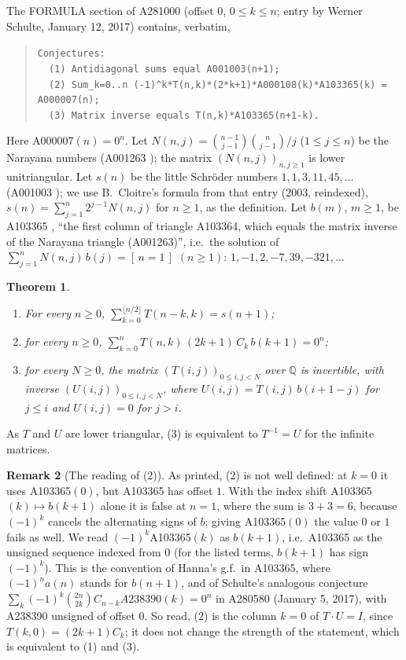 \documentclass[11pt]{amsart}
\theoremstyle{plain}
\newtheorem{theorem}{Theorem}
\theoremstyle{definition}
\newtheorem{remark}[theorem]{Remark}
\newcommand{\Q}{\mathbb{Q}}
\newcommand{\ib}[1]{[\,#1\,]}
\newcommand{\lb}{\char123}
\newcommand{\rb}{\char125}
\begin{document}
The FORMULA section of A281000 \cite{A281000} (offset $0$, $0\le k\le n$; entry by Werner Schulte, January 12, 2017) contains, verbatim,
\begin{quote}\raggedright\footnotesize
\texttt{Conjectures:}\\
\texttt{\ \ (1) Antidiagonal sums equal A001003(n+1);}\\
\texttt{\ \ (2) Sum\_\lb k=0..n\rb\ (-1)\^{}k*T(n,k)*(2*k+1)*A000108(k)*A103365(k) = A000007(n);}\\
\texttt{\ \ (3) Matrix inverse equals T(n,k)*A103365(n+1-k).}
\end{quote}
Here A000007$(n)=0^n$. Let $N(n,j)=\binom{n-1}{j-1}\binom n{j-1}/j$ ($1\le j\le n$) be the Narayana numbers (A001263 \cite{A001263}); the matrix $(N(n,j))_{n,j\ge1}$ is lower unitriangular. Let $s(n)$ be the little Schr\"oder numbers $1,1,3,11,45,\dots$ (A001003 \cite{A001003}); we use B.~Cloitre's formula from that entry (2003, reindexed), $s(n)=\sum_{j=1}^{n}2^{j-1}N(n,j)$ for $n\ge1$, as the definition. Let $b(m)$, $m\ge1$, be A103365 \cite{A103365}, ``the first column of triangle A103364, which equals the matrix inverse of the Narayana triangle (A001263)'', i.e.\ the solution of $\sum_{j=1}^{n}N(n,j)\,b(j)=\ib{n=1}$ $(n\ge1)$: $1,-1,2,-7,39,-321,\dots$

\begin{theorem}\label{thm:main}
\begin{enumerate}
\item[(1)] For every $n\ge0$,  $\displaystyle\sum_{k=0}^{\lfloor n/2\rfloor}T(n-k,k)=s(n+1)$;
\item[(2)] for every $n\ge0$, $\displaystyle\sum_{k=0}^{n}T(n,k)\,(2k+1)\,C_k\,b(k+1)=0^n$;
\item[(3)] for every $N\ge0$, the matrix $(T(i,j))_{0\le i,j<N}$ over $\Q$ is invertible, with inverse $(U(i,j))_{0\le i,j<N}$, where $U(i,j)=T(i,j)\,b(i+1-j)$ for $j\le i$ and $U(i,j)=0$ for $j>i$.
\end{enumerate}
\end{theorem}
As $T$ and $U$ are lower triangular, (3) is equivalent to $T^{-1}=U$ for the infinite matrices.

\begin{remark}[The reading of (2)]\label{rem:reading}
As printed, (2) is not well defined: at $k=0$ it uses A103365$(0)$, but A103365 has offset $1$. With the index shift A103365$(k)\mapsto b(k+1)$ alone it is false at $n=1$, where the sum is $3+3=6$, because $(-1)^k$ cancels the alternating signs of $b$; giving A103365$(0)$ the value $0$ or $1$ fails as well. We read $(-1)^k$A103365$(k)$ as $b(k+1)$, i.e.\ A103365 as the unsigned sequence indexed from $0$ (for the listed terms, $b(k+1)$ has sign $(-1)^k$). This is the convention of Hanna's g.f.\ in A103365, where $(-1)^na(n)$ stands for $b(n+1)$, and of Schulte's analogous conjecture $\sum_k(-1)^k\binom{2n}{2k}C_{n-k}A238390(k)=0^n$ in A280580 \cite{A280580} (January 5, 2017), with A238390 unsigned of offset $0$. So read, (2) is the column $k=0$ of $T\cdot U=I$, since $T(k,0)=(2k+1)C_k$; it does not change the strength of the statement, which is equivalent to (1) and (3).
\end{remark}
\end{document}

